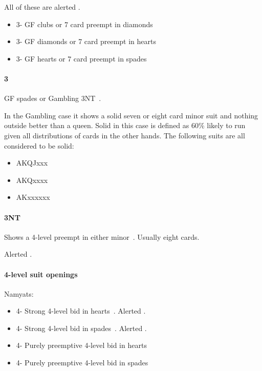All of these are alerted .

\begin{itemize}
\item 3\clubs - GF clubs or 7 card preempt in diamonds 
\item 3\diamonds - GF diamonds or 7 card preempt in hearts 
\item 3\hearts - GF hearts or 7 card preempt in spades 
\end{itemize}

\paragraph{3\spades}

GF spades or Gambling 3NT~. 

In the Gambling case it shows a solid seven or eight card minor suit and nothing outside better than a
queen.  Solid in this case is defined as 60\% likely to run given all
distributions of cards in the other hands. The following suits are all
considered to be solid:

\begin{itemize}
\item AKQJxxx
\item AKQxxxx
\item AKxxxxxx
\end{itemize}

\paragraph{3NT}

Shows a 4-level preempt in either minor~. Usually eight cards. 

Alerted .

\paragraph{4-level suit openings}

Namyats:

\begin{itemize}
\item 4\clubs - Strong 4-level bid in hearts~. Alerted .
\item 4\diamonds - Strong 4-level bid in spades~. Alerted .
\item 4\hearts - Purely preemptive 4-level bid in hearts
\item 4\spades - Purely preemptive 4-level bid in spades
\end{itemize}

